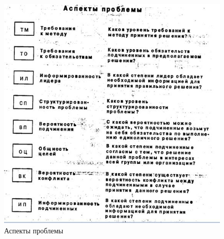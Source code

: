 \documentclass[a4paper,12pt,oneside,final]{extarticle}
\makeatletter
\numberwithin{equation}{section}
\def\maxwidth#1{\ifdim\Gin@nat@width>#1 #1\else\Gin@nat@width\fi}
\makeatother
\begin{document}
\begin{figure}[h]
	\centering
	\includegraphics[width=\maxwidth{\textwidth}]{management-figures/leadership_vyy_1}
	\caption{Аспекты проблемы}
	\label{leadership_vyy_1}
\end{figure}
\end{document}
